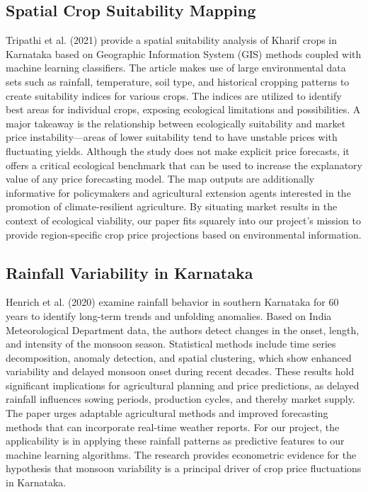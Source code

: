 \subsection{Spatial Crop Suitability Mapping \cite{tripathi2021mapping}}
Tripathi et al. (2021) provide a spatial suitability analysis of Kharif crops in Karnataka based on Geographic Information System (GIS) methods coupled with machine learning classifiers. The article makes use of large environmental data sets such as rainfall, temperature, soil type, and historical cropping patterns to create suitability indices for various crops. The indices are utilized to identify best areas for individual crops, exposing ecological limitations and possibilities. A major takeaway is the relationship between ecologically suitability and market price instability—areas of lower suitability tend to have unstable prices with fluctuating yields. Although the study does not make explicit price forecasts, it offers a critical ecological benchmark that can be used to increase the explanatory value of any price forecasting model. The map outputs are additionally informative for policymakers and agricultural extension agents interested in the promotion of climate-resilient agriculture. By situating market results in the context of ecological viability, our paper fits squarely into our project's mission to provide region-specific crop price projections based on environmental information.

\subsection{Rainfall Variability in Karnataka \cite{henrich2020rainfall}}
Henrich et al. (2020) examine rainfall behavior in southern Karnataka for 60 years to identify long-term trends and unfolding anomalies. Based on India Meteorological Department data, the authors detect changes in the onset, length, and intensity of the monsoon season. Statistical methods include time series decomposition, anomaly detection, and spatial clustering, which show enhanced variability and delayed monsoon onset during recent decades. These results hold significant implications for agricultural planning and price predictions, as delayed rainfall influences sowing periods, production cycles, and thereby market supply. The paper urges adaptable agricultural methods and improved forecasting methods that can incorporate real-time weather reports. For our project, the applicability is in applying these rainfall patterns as predictive features to our machine learning algorithms. The research provides econometric evidence for the hypothesis that monsoon variability is a principal driver of crop price fluctuations in Karnataka.

